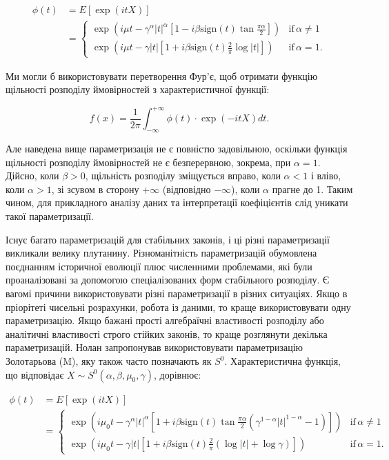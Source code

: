 \documentclass[
  letterpaper,
]{report}
\begin{document}
\begin{equation}
    \begin{split}
    \phi(t) &= E\left[\exp(itX)\right] \\
            &= 
        \begin{cases} 
            \exp\left(i \mu t - \gamma^{\alpha}|t|^{\alpha} \left[1-i\beta\text{sign}(t)\tan{\frac{\pi\alpha}{2}}\right]\right) & \text{if} \, \alpha \neq 1 \\ \exp\left(i \mu t - \gamma|t| \left[1+i\beta\text{sign}(t)\frac{2}{\pi}\log{|t|}\right]\right) & \text{if} \, \alpha = 1. 
        \end{cases} 
    \end{split}
\end{equation}

Ми могли б використовувати перетворення Фур'є, щоб отримати функцію
щільності розподілу ймовірностей з характеристичної функції:

\[ 
f(x) = \frac{1}{2\pi}\int_{-\infty}^{+\infty} \phi(t) \cdot \exp(-itX) dt. 
\]

Але наведена вище параметризація не є повністю задовільною, оскільки
функція щільності розподілу ймовірностей не є безперервною, зокрема, при
\(\alpha = 1\). Дійсно, коли \(\beta > 0\), щільність розподілу
зміщується вправо, коли \(\alpha < 1\) і вліво, коли \(\alpha > 1\), зі
зсувом в сторону \(+\infty\) (відповідно \(-\infty\)), коли \(\alpha\)
прагне до 1. Таким чином, для прикладного аналізу даних та інтерпретації
коефіцієнтів слід уникати такої параметризації.

Існує багато параметризацій для стабільних законів, і ці різні
параметризації викликали велику плутанину. Різноманітність
параметризацій обумовлена поєднанням історичної еволюції плюс численними
проблемами, які були проаналізовані за допомогою спеціалізованих форм
стабільного розподілу. Є вагомі причини використовувати різні
параметризації в різних ситуаціях. Якщо в пріорітеті чисельні
розрахунки, робота із даними, то краще використовувати одну
параметризацію. Якщо бажані прості алгебраїчні властивості розподілу або
аналітичні властивості строго стійких законів, то краще розглянути
декілька параметризацій. Нолан запропонував використовувати
параметризацію Золотарьова (M), яку також часто позначають як \(S^{0}\).
Характеристична функція, що відповідає
\(X \sim S^{0}(\alpha, \beta, \mu_{0}, \gamma)\), дорівнює:

\begin{equation}
    \begin{split}
    \phi(t) &= E\left[\exp(itX)\right] \\
            &= 
        \begin{cases} 
            \exp\left(i \mu_{0} t - \gamma^{\alpha}|t|^{\alpha} \left[1+i\beta\text{sign}(t)\tan{\frac{\pi\alpha}{2}}\left( \gamma^{1-\alpha}|t|^{1-\alpha}-1 \right)\right]\right) & \text{if} \, \alpha \neq 1 \\ \exp\left(i \mu_{0} t - \gamma|t| \left[1+i\beta\text{sign}(t)\frac{2}{\pi}\left(\log{|t|} + \log{\gamma}\right) \right]\right) & \text{if} \, \alpha = 1. 
        \end{cases}
    \end{split} 
\end{equation}
\end{document}

